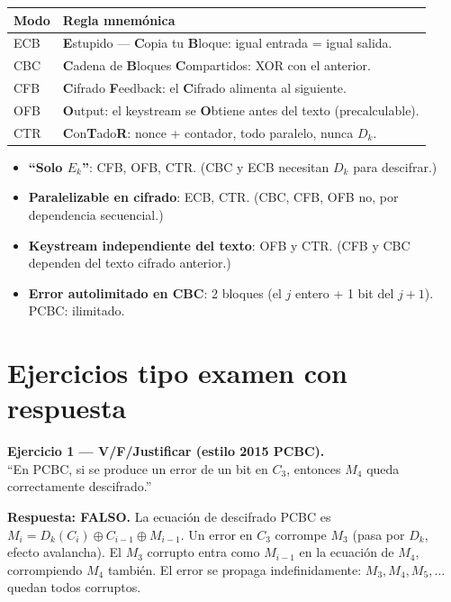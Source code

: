 \documentclass[11pt,a4paper]{article}
\begin{document}
\begin{center}
\renewcommand{\arraystretch}{1.4}
\begin{tabular}{@{}ll@{}}
\toprule
\textbf{Modo} & \textbf{Regla mnem\'onica} \\
\midrule
ECB & \textbf{E}stupido --- \textbf{C}opia tu \textbf{B}loque: igual entrada = igual salida. \\
CBC & \textbf{C}adena de \textbf{B}loques \textbf{C}ompartidos: XOR con el anterior. \\
CFB & \textbf{C}ifrado \textbf{F}eedback: el \textbf{C}ifrado alimenta al siguiente. \\
OFB & \textbf{O}utput: el keystream se \textbf{O}btiene antes del texto (precalculable). \\
CTR & \textbf{C}on\textbf{T}ado\textbf{R}: nonce + contador, todo paralelo, nunca $D_k$. \\
\bottomrule
\end{tabular}
\end{center}

\begin{itemize}[nosep]
  \item \textbf{``Solo $E_k$''}: CFB, OFB, CTR. (CBC y ECB necesitan $D_k$
    para descifrar.)
  \item \textbf{Paralelizable en cifrado}: ECB, CTR. (CBC, CFB, OFB no,
    por dependencia secuencial.)
  \item \textbf{Keystream independiente del texto}: OFB y CTR. (CFB y CBC
    dependen del texto cifrado anterior.)
  \item \textbf{Error autolimitado en CBC}: 2 bloques (el $j$ entero + 1
    bit del $j+1$). PCBC: ilimitado.
\end{itemize}

\section{Ejercicios tipo examen con respuesta}

\begin{examen}
\textbf{Ejercicio 1 --- V/F/Justificar (estilo 2015 PCBC).}\\
``En PCBC, si se produce un error de un bit en $C_3$, entonces $M_4$ queda
correctamente descifrado.''

\medskip
\textbf{Respuesta: FALSO.} La ecuaci\'on de descifrado PCBC es
$M_i = D_k(C_i)\oplus C_{i-1}\oplus M_{i-1}$. Un error en $C_3$ corrompe
$M_3$ (pasa por $D_k$, efecto avalancha). El $M_3$ corrupto entra como
$M_{i-1}$ en la ecuaci\'on de $M_4$, corrompiendo $M_4$ tambi\'en. El error
se propaga indefinidamente: $M_3, M_4, M_5, \ldots$ quedan todos corruptos.
\end{examen}
\end{document}
